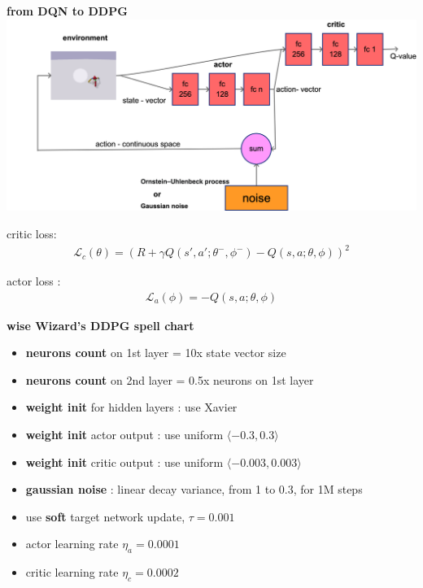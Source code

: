 \documentclass[xcolor=dvipsnames]{beamer}
\begin{document}
\begin{frame}{\bf from DQN to DDPG}
  {\centering \includegraphics[scale=0.16]{../diagrams/ddpgdetail.png}}

    critic loss:
    \begin{align*}
      \mathcal{L}_c(\theta) = \left( R + \gamma Q(s', a'; \theta^-, \phi^- ) - Q(s, a; \theta, \phi )  \right)^2
    \end{align*}

    actor loss :
    \begin{align*}
      \mathcal{L}_a(\phi) = -Q(s, a; \theta, \phi)
    \end{align*}
\end{frame}

\begin{frame}{\bf wise Wizard's DDPG spell chart}
  \begin{itemize}
    \item {\bf \color{red} neurons count} on 1st layer = 10x  state vector size
    \item {\bf \color{red} neurons count} on 2nd layer = 0.5x neurons on 1st layer
    \item {\bf \color{red} weight init} for hidden layers : use Xavier
    \item {\bf \color{red} weight init} actor output  : use uniform $\langle -0.3, 0.3 \rangle$
    \item {\bf \color{red} weight init} critic output : use uniform $\langle -0.003, 0.003 \rangle$
    \item {\bf \color{red} gaussian noise} : linear decay variance, from 1 to 0.3, for 1M steps 
    \item use {\bf \color{red} soft} target network update, $\tau = 0.001$
    \item actor learning rate $\eta_a = 0.0001$
    \item critic learning rate $\eta_c = 0.0002$
  \end{itemize}
\end{frame}
\end{document}
